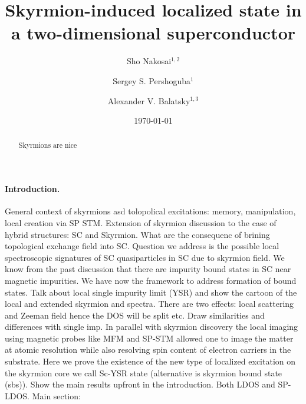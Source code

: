 \documentclass[twocolumn,showpacs,floatfix,nofootinbib,longbibliography]{revtex4-1}
\begin{document}
\title{Skyrmion-induced localized state in a two-dimensional superconductor}

\author{Sho Nakosai$^{1,2}$}
\author{Sergey S. Pershoguba$^{1}$}
\author{Alexander V. Balatsky$^{1,3}$}

\date{\today}


\begin{abstract}
Skyrmions are nice
\end{abstract}

\pacs{ }   


\maketitle
\paragraph*{Introduction.} \label{sec:intro}

General context of skyrmions asd tolopolical excitations: memory, manipulation, local creation via SP STM.
Extension of skyrmion discussion to the case of hybrid structures: SC and Skyrmion. What are the consequenc of brining topological exchange field into SC. Question we address is the possible local spectroscopic signatures of SC quasiparticles in SC due to skyrmion field. We know from the past discussion that there are impurity bound states in SC near magnetic impurities. We have now the framework to address formation of bound states. Talk about local single impurity limit (YSR) and show the cartoon of the local and extended skyrmion and spectra. There are two effects: local scattering and Zeeman field hence the DOS will be split etc.  Draw similarities and differences with single imp.
In parallel with skyrmion discovery the local imaging using magnetic probes like MFM and SP-STM allowed one to image the matter at atomic resolution while also resolving spin content of electron carriers in the substrate.  
Here we prove the existence of the new type of localized excitation on the skyrmion core we call  Sc-YSR state (alternative is skyrmion bound state (sbs)).  Show the main results upfront in the introduction. Both LDOS and SP-LDOS. 
Main section: 
\end{document}

